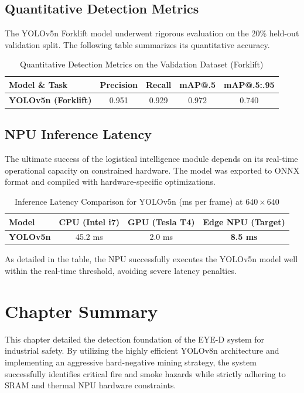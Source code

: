 \subsection{Quantitative Detection Metrics}
The YOLOv5n Forklift model underwent rigorous evaluation on the 20\% held-out validation split. The following table summarizes its quantitative accuracy.

\begin{table}[htbp]
\centering
\caption{Quantitative Detection Metrics on the Validation Dataset (Forklift)}
\renewcommand{\arraystretch}{1.2}
\begin{tabular}{|l|c|c|c|c|}
\hline
\textbf{Model \& Task} & \textbf{Precision} & \textbf{Recall} & \textbf{mAP@.5} & \textbf{mAP@.5:.95} \\
\hline
\textbf{YOLOv5n (Forklift)} & 0.951 & 0.929 & 0.972 & 0.740 \\
\hline
\end{tabular}
\end{table}

\subsection{NPU Inference Latency}
The ultimate success of the logistical intelligence module depends on its real-time operational capacity on constrained hardware. The model was exported to ONNX format and compiled with hardware-specific optimizations.

\begin{table}[htbp]
\centering
\caption{Inference Latency Comparison for YOLOv5n (ms per frame) at $640 \times 640$}
\renewcommand{\arraystretch}{1.2}
\begin{tabular}{|l|c|c|c|}
\hline
\textbf{Model} & \textbf{CPU (Intel i7)} & \textbf{GPU (Tesla T4)} & \textbf{Edge NPU (Target)} \\
\hline
\textbf{YOLOv5n} & 45.2 ms & 2.0 ms & \textbf{8.5 ms} \\
\hline
\end{tabular}
\end{table}

As detailed in the table, the NPU successfully executes the YOLOv5n model well within the real-time threshold, avoiding severe latency penalties.


\section{Chapter Summary}
This chapter detailed the detection foundation of the EYE-D system for industrial safety. By utilizing the highly efficient YOLOv8n architecture and implementing an aggressive hard-negative mining strategy, the system successfully identifies critical fire and smoke hazards while strictly adhering to SRAM and thermal NPU hardware constraints.



